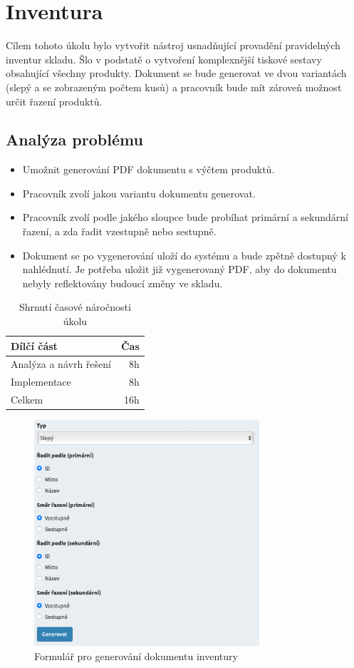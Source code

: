 \section{Inventura}

Cílem tohoto úkolu bylo vytvořit nástroj usnadňující provadění pravidelných inventur skladu. Šlo v podstatě o vytvoření komplexnější tiskové sestavy obsahující všechny produkty. Dokument se bude generovat ve dvou variantách (slepý a se zobrazeným počtem kusů) a pracovník bude mít zároveň možnost určit řazení produktů.



\subsection{Analýza problému}

\begin{itemize}
    \item Umožnit generování PDF dokumentu s výčtem produktů.
    \item Pracovník zvolí jakou variantu dokumentu generovat.
    \item Pracovník zvolí podle jakého sloupce bude probíhat primární a sekundární řazení, a zda řadit vzestupně nebo sestupně.
    \item Dokument se po vygenerování uloží do systému a bude zpětně dostupný k nahlédnutí. Je potřeba uložit již vygenerovaný PDF, aby do dokumentu nebyly reflektovány budoucí změny ve skladu.
\end{itemize}


\begin{table}
	\centering
	\caption[Časová náročnost úkolu na inventuru]{Shrnutí časové náročnosti úkolu}
	\label{tab:TopLevelTableLabel}
		\begin{tabular}{lr}
			\toprule
			Dílčí část & Čas\\
			\midrule
			Analýza a návrh řešení & 8h \\
			Implementace  & 8h \\
            Celkem  & 16h \\
			\midrule
		\end{tabular}
\end{table}

\begin{figure}
    \centering
    \includegraphics[width=0.5\linewidth]{Figures/inventura-pdf.png}
    \caption{Formulář pro generování dokumentu inventury}
    \label{fig:FormularInventura}
\end{figure}

